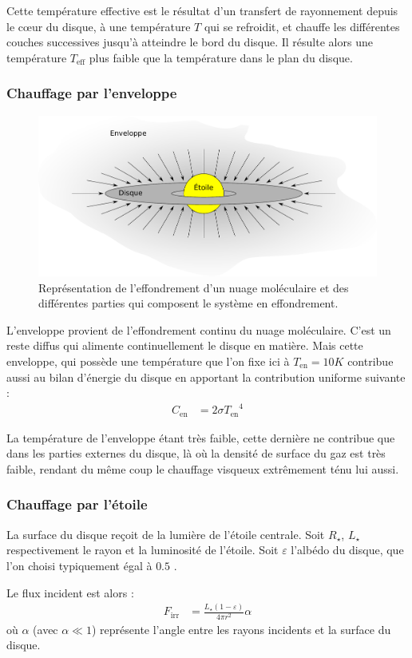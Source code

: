 Cette température effective est le résultat d'un transfert de rayonnement depuis le cœur du disque, à une température $T$ qui se refroidit, et chauffe les différentes couches successives jusqu'à atteindre le bord du disque. Il résulte alors une température $T_\text{eff}$ plus faible que la température dans le plan du disque. 

\subsubsection{Chauffage par l'enveloppe}
\begin{figure}[htbp]
\centering
\includegraphics[width=0.45\linewidth]{figure/disk_envelope.pdf}
\caption{Représentation de l'effondrement d'un nuage moléculaire et des différentes parties qui composent le système en effondrement.}\label{fig:envelope}
\end{figure}
L'enveloppe  provient de l'effondrement continu du nuage moléculaire. C'est un reste diffus qui alimente continuellement le disque en matière. Mais cette enveloppe, qui possède une température que l'on fixe ici à $T_\text{en} = 10\unit{K}$ contribue aussi au bilan d'énergie du disque en apportant la contribution uniforme suivante :
\begin{align}
C_\text{en} &= 2 \sigma {T_\text{en}}^4
\end{align}

La température de l'enveloppe étant très faible, cette dernière ne contribue que dans les parties externes du disque, là où la densité de surface du gaz est très faible, rendant du même coup le chauffage visqueux extrêmement ténu lui aussi.

\subsubsection{Chauffage par l'étoile}\label{sec:irradiation}
La surface du disque reçoit de la lumière de l'étoile centrale. Soit $R_\star$, $L_\star$ respectivement le rayon et la luminosité de l'étoile. Soit $\varepsilon$ l'albédo du disque, que l'on choisi typiquement égal à $0.5$  \citep{menou2004low}. 

Le flux incident est alors \citep[eq. (7)]{menou2004low} : 
\begin{align}
F_\text{irr} &= \frac{L_\star(1-\varepsilon)}{4\pi r^2} \alpha
\end{align}
où $\alpha$ (avec $\alpha\ll 1$) représente l'angle entre les rayons incidents et la surface du disque. 

